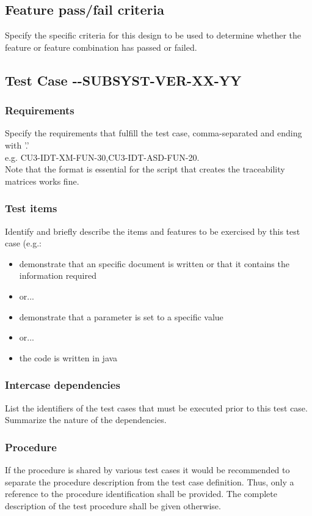 \documentclass[CUx,lsstdraft,STS]{lsstdoc}
\begin{document}
\subsection{Feature pass/fail criteria \label{sect:passfail}}
Specify the specific criteria for this design to be used to determine whether the feature or feature combination has passed or failed.

\subsection{Test Case \CU-\product-SUBSYST-VER-XX-YY \label{sect:testcaseid}}

\subsubsection{Requirements \label{sect:reqs}}
Specify the requirements that fulfill the test case, comma-separated and ending with '.'\\
e.g. CU3-IDT-XM-FUN-30,CU3-IDT-ASD-FUN-20.\\
Note that the format is essential for the script that creates the traceability matrices works fine.

\subsubsection{Test items \label{sect:tcitems}}
Identify and briefly describe the items and features to be exercised by this test case (e.g.:
\begin{itemize}
\item  demonstrate that an
specific document is written or that it contains the information required
\item or...
\item demonstrate that a parameter is set to a specific value
\item or...
\item the code is written in java
\end{itemize}

\subsubsection{Intercase dependencies \label{interface_dependencies}}
List the identifiers of the test cases that must be executed prior to this test case. Summarize the nature of the dependencies.

\subsubsection{Procedure \label{procedures}}
If the procedure is shared by various test cases it would be recommended to separate the procedure description from the test
case definition. Thus, only a reference to the procedure identification shall be provided. The complete description of
the test procedure shall be given otherwise. \\
\end{document}
